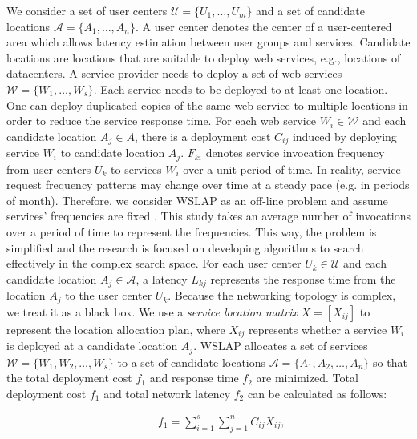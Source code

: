 \documentclass[10pt,journal,compsoc]{IEEEtran}
\begin{document}
We consider a set of user centers $\mathcal{U }= \{U_1, \dots, U_m \}$ and a set of candidate locations $\mathcal{A} = \{A_1, \dots, A_n\}$. A user center denotes the center of a user-centered area which allows latency estimation between user groups and services. Candidate locations are locations that are suitable to deploy web services, e.g., locations of datacenters. A service provider needs to deploy a set of web services $\mathcal{W} = \{W_1, \dots, W_s\}$. Each service needs to be deployed to at least one location. One can deploy duplicated copies of the same web service to multiple locations in order to reduce the service response time. For each web service $W_i \in \mathcal{W}$ and each candidate location $A_j \in A$, there is a deployment cost $C_{ij}$ induced by deploying service $W_i$ to candidate location $A_j$. $F_{ki}$ denotes service invocation frequency from user centers $U_k$ to services $W_i$ over a unit period of time. In reality, service request frequency patterns may change over time at a steady pace (e.g. in periods of month). Therefore, we consider WSLAP as an off-line problem and assume services' frequencies are fixed \cite{Energy_9}. This study takes an average number of invocations over a period of time to represent the frequencies. This way, the problem is simplified and the research is focused on developing algorithms to search effectively in the complex search space. For each user center $U_k \in \mathcal{U}$ and each candidate location $A_j \in \mathcal{A}$, a latency $L_{kj}$ represents the response time from the location $A_j$ to the user center $U_k$. Because the networking topology is complex, we treat it as a black box.
We use a \emph{service location matrix} $X = [X_{ij}]$ to represent the location allocation plan, where $X_{ij}$ represents whether a service $W_i$ is deployed at a candidate location $A_j$. WSLAP allocates a set of services $\mathcal{W} = \{ W_1, W_2, \dots,  W_s\}$  to a set of candidate locations $\mathcal{A}= \{ A_1, A_2, \dots,  A_n \}$ so that the total deployment cost $f_1$ and response time $f_2$ are minimized. Total deployment cost $f_1$ and total network latency $f_2$ can be calculated as follows:

\small
\begin{equation} \label{eq:fit-cost}
\begin{aligned}
& & &  f_1 = \sum\limits_{i=1}^s \sum\limits_{j = 1}^n C_{ij} X_{ij},
\end{aligned}
\end{equation}
\end{document}
